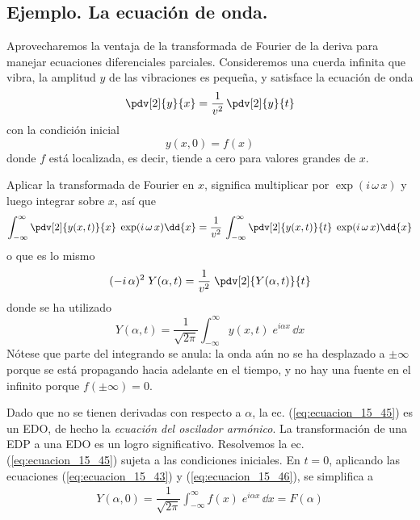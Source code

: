\subsection*{Ejemplo. La ecuación de onda.}

Aprovecharemos la ventaja de la transformada de Fourier de la deriva para manejar ecuaciones diferenciales parciales. Consideremos una cuerda infinita que vibra, la amplitud $y$ de las vibraciones es pequeña, y satisface la ecuación de onda
\begin{equation}
\pdv[2]{y}{x} = \dfrac{1}{v^{2}} \, \pdv[2]{y}{t}
\label{eq:ecuacion_15_42}
\end{equation}
con la condición inicial
\begin{equation}
y(x, 0) = f(x)
\label{eq:ecuacion_15_43}
\end{equation}
donde $f$ está localizada, es decir, tiende a cero para valores grandes de $x$.
\par
Aplicar la transformada de Fourier en $x$, significa multiplicar por $\exp(i \, \omega \, x)$ y luego integrar sobre $x$, así que
\begin{align}
\int_{-\infty}^{\infty} \pdv[2]{y(x, t)}{x} \; \exp(i \, \omega \, x) \dd{x} = \dfrac{1}{v^{2}} \, \int_{-\infty}^{\infty} \pdv[2]{y (x, t)}{t} \; \exp(i \, \omega \, x) \dd{x}
\label{eq:ecuacion_15_44}
\end{align}
o que es lo mismo
\begin{equation}
(-i \, \alpha)^{2} \; Y(\alpha, t) = \dfrac{1}{v^{2}} \; \pdv[2]{Y(\alpha, t)}{t}
\label{eq:ecuacion_15_45}
\end{equation}
donde se ha utilizado
\begin{equation}
Y(\alpha, t) = \dfrac{1}{\sqrt{2 \pi}} \int_{-\infty}^{\infty} y(x, t) \; e^{i \alpha x} \, \dd x
\label{eq:ecuacion_15_46}
\end{equation}
Nótese que parte del integrando se anula: la onda aún no se ha desplazado a $\pm \infty$ porque se está propagando hacia adelante en el tiempo, y no hay una fuente en el infinito porque $f(\pm \infty) = 0$.
\par
Dado que no se tienen derivadas con respecto a $\alpha$, la ec. (\ref{eq:ecuacion_15_45}) es un EDO, de hecho la \emph{ecuación del oscilador armónico}. La transformación de una EDP a una EDO es un logro significativo. Resolvemos la ec. (\ref{eq:ecuacion_15_45}) sujeta a las condiciones iniciales. En $t=0$, aplicando las ecuaciones (\ref{eq:ecuacion_15_43}) y (\ref{eq:ecuacion_15_46}), se simplifica a
\begin{align}
Y(\alpha, 0) = \dfrac{1}{\sqrt{2 \pi}} \int_{-\infty}^{\infty} f(x) \; e^{i \alpha x} \, \dd x =  F(\alpha)
\label{eq:ecuacion_15_47}
\end{align}
